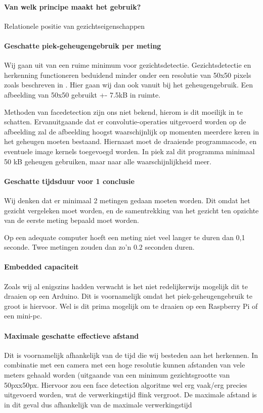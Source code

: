 \documentclass[11pt]{article}
\begin{document}
    \paragraph{Van welk principe maakt het gebruik?}
    Relationele positie van gezichtseigenschappen

    \paragraph{Geschatte piek-geheugengebruik per meting}
    Wij gaan uit van een ruime minimum voor gezichtsdetectie.
    Gezichtsdetectie en herkenning functioneren beduidend minder onder een resolutie van 50x50 pixels zoals beschreven in \citet{boom2006effect}.
    Hier gaan wij dan ook vanuit bij het geheugengebruik.
    Een afbeelding van 50x50 gebruikt +- 7.5kB in ruimte.

    Methoden van facedetection zijn ons niet bekend, hierom is dit moeilijk in te schatten.
    Ervanuitgaande dat er convolutie-operaties uitgevoerd worden op de afbeelding zal de afbeelding hoogst waarschijnlijk op momenten meerdere keren in het geheugen moeten bestaand.
    Hiernaast moet de draaiende programmacode, en eventuele image kernels toegevoegd worden.
    In piek zal dit programma minimaal 50 kB geheugen gebruiken, maar naar alle waarschijnlijkheid meer.

    \paragraph{Geschatte tijdsduur voor 1 conclusie}
    Wij denken dat er minimaal 2 metingen gedaan moeten worden.
    Dit omdat het gezicht vergeleken moet worden, en de samentrekking van het gezicht ten opzichte van de eerste meting bepaald moet worden.

    Op een adequate computer hoeft een meting niet veel langer te duren dan 0,1 seconde.
    Twee metingen zouden dan zo'n 0.2 seconden duren.

    \paragraph{Embedded capaciteit}
    Zoals wij al enigszins hadden verwacht is het niet redelijkerwijs mogelijk dit te draaien op een Arduino.
    Dit is voornamelijk omdat het piek-geheugengebruik te groot is hiervoor.
    Wel is dit prima mogelijk om te draaien op een Raspberry Pi of een mini-pc.

    \paragraph{Maximale geschatte effectieve afstand}
    Dit is voornamelijk afhankelijk van de tijd die wij besteden aan het herkennen.
    In combinatie met een camera met een hoge resolutie kunnen afstanden van vele meters gehaald worden (uitgaande van een minimum gezichtsgrootte van 50pxx50px.
    Hiervoor zou een face detection algoritme wel erg vaak/erg precies uitgevoerd worden, wat de verwerkingstijd flink vergroot.
    De maximale afstand is in dit geval dus afhankelijk van de maximale verwerkingstijd
\end{document}

